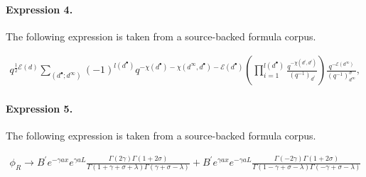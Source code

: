 \documentclass[11pt]{article}
\begin{document}
\paragraph{Expression 4.} The following expression is taken from a source-backed formula corpus.

\begin{align*}q^{\frac{1}{2} \mathcal{E}(d)} \sum_{(d^{\bullet}; d^{\infty})} (-1)^{l(d^{\bullet})} q^{-\chi( d^{\bullet} ) - \chi( d^{\infty}, d^{\bullet} ) - \mathcal{E}(d^{\bullet})} \left( \prod_{i=1}^{l(d^{\bullet})} \frac{q^{-\chi( d^i , d^i )}}{(q^{-1})_{d^i}} \right) \frac{q^{-\mathcal{E}(d^{\infty})}}{(q^{-1})^{\sigma}_{d^{\infty}}},\end{align*}

\paragraph{Expression 5.} The following expression is taken from a source-backed formula corpus.

\begin{align*}\phi_R \rightarrow B^{\prime} e^{-\gamma a x}e^{\gamma a L} \frac{\Gamma(2\gamma) \Gamma(1+2\sigma)}{\Gamma (1+\gamma +\sigma +\lambda) \Gamma (\gamma + \sigma - \lambda)}+B^{\prime} e^{\gamma a x}e^{-\gamma a L} \frac{\Gamma(-2\gamma) \Gamma(1+2\sigma)}{\Gamma (1-\gamma +\sigma -\lambda) \Gamma (-\gamma + \sigma - \lambda)}\end{align*}
\end{document}
